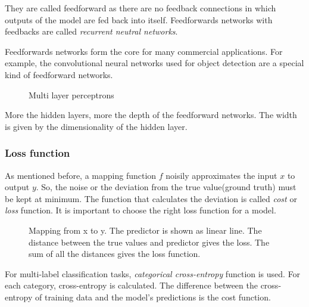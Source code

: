 They are called feedforward as there are no feedback connections in which outputs of the
model are fed back into itself. Feedforwards networks with feedbacks are called
\textit{recurrent neutral networks}.

Feedforwards networks form the core for many commercial applications. For example, the
convolutional neural networks used for object detection are a special kind of feedforward
networks.
\begin{figure}[h]
    \def\svgwidth{0.5\textwidth}
	\begin{center}
    \end{center}
    \caption{Multi layer perceptrons}
    \label{fig:MLP}
\end{figure}

More the hidden layers, more the depth of the feedforward networks. The width is given by
the dimensionality of the hidden layer.

\subsubsection*{Loss function}
As mentioned before, a mapping function $f$ noisily approximates the input $x$ to output
$y$. So, the noise or the deviation from the true value(ground truth) must be kept at
minimum. The function that calculates the deviation is called \textit{cost} or
\textit{loss} function. It is important to choose the right loss function for a model.

\begin{figure}[h]
	\centering
    \def\svgwidth{0.5\textwidth}
    \caption{Mapping from x to y. The predictor is shown as linear line. The distance
    between the true values and predictor gives the loss. The sum of all the distances
gives the loss function.}
\label{fig:loss function}
\end{figure}

For multi-label classification tasks, \textit{categorical cross-entropy} function is used.
For each category, cross-entropy is calculated. The difference between the cross-entropy
of training data and the model's predictions is the cost function.

